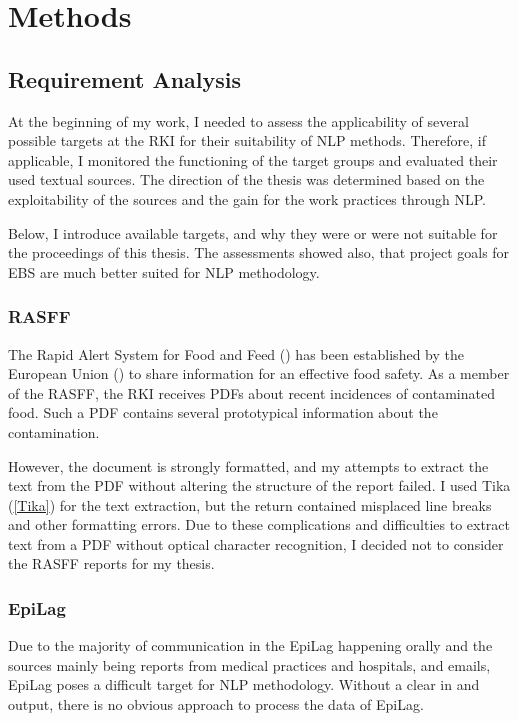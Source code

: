\chapter{Methods}

\section{Requirement Analysis}
At the beginning of my work, I needed to assess the applicability of several possible targets at the RKI for their suitability of NLP methods.
Therefore, if applicable, I monitored the functioning of the target groups and evaluated their used textual sources.
The direction of the thesis was determined based on the exploitability of the sources and the gain for the work practices through NLP.

Below, I introduce available targets, and why they were or were not suitable for the proceedings of this thesis. The assessments showed also, that project goals for EBS are much better suited for NLP methodology.

\subsection{RASFF}
The Rapid Alert System for Food and Feed () has been established by the European Union () to share information for an effective food safety. As a member of the RASFF, the RKI receives PDFs about recent incidences of contaminated food. Such a PDF contains several prototypical information about the contamination.

However, the document is strongly formatted, and my attempts to extract the text from the PDF without altering the structure of the report failed. I used Tika (\ref{Tika}) for the text extraction, but the return contained misplaced line breaks and other formatting errors. Due to these complications and difficulties to extract text from a PDF without optical character recognition, I decided not to consider the RASFF reports for my thesis.

\subsection{EpiLag}
Due to the majority of communication in the EpiLag happening orally and the sources mainly being reports from medical practices and hospitals, and emails, EpiLag poses a difficult target for NLP methodology.
Without a clear in and output, there is no obvious approach to process the data of EpiLag.

